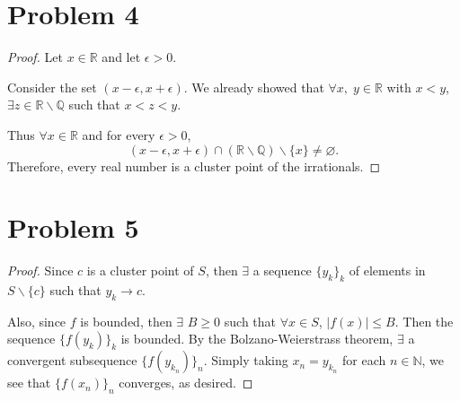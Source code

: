\documentclass{article}
\newcommand{\R}{\mathbb{R}} %
\newcommand{\N}{\mathbb{N}} %
\newcommand{\Q}{\mathbb{Q}} %
\begin{document}
\section*{Problem 4}
\begin{proof}
	Let $x \in \R$ and let $\epsilon > 0$. 
	
	Consider the set $(x - \epsilon, x + \epsilon)$. We already showed that $\forall x,\;y \in \R$ with $x < y$, $\exists z \in \R \backslash \Q$ such that $x < z < y$.
	
	Thus $\forall x \in \R$ and for every $\epsilon > 0$,
	\begin{equation}
		(x - \epsilon, x + \epsilon) \cap (\R \backslash \Q) \backslash \{x\} \neq \varnothing.
	\end{equation}
	Therefore, every real number is a cluster point of the irrationals.
\end{proof}
\section*{Problem 5}
\begin{proof}
	Since $c$ is a cluster point of $S$, then $\exists$ a sequence $\{y_k\}_k$ of elements in $S \backslash \{c\}$ such that $y_k \to c$.
	
	Also, since $f$ is bounded, then $\exists$ $B \geq 0$ such that $\forall x \in S$, $|f(x)| \leq B$. Then the sequence $\{f(y_k)\}_k$ is bounded. By the Bolzano-Weierstrass theorem, $\exists$ a convergent subsequence $\{f(y_{k_n})\}_n$. Simply taking $x_n = y_{k_n}$ for each $n \in \N$, we see that $\{f(x_n)\}_n$ converges, as desired.
\end{proof}
\end{document}
